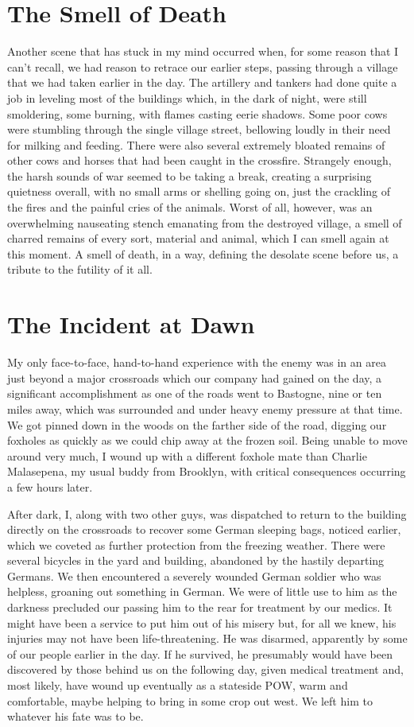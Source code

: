 \documentclass[../m3y]{subfiles}
\begin{document}
\section{The Smell of Death}
Another scene that has stuck in my mind occurred when, for some reason that I can't recall, we had reason to retrace our earlier steps, passing through a village that we had taken earlier in the day. The artillery and tankers had done quite a job in leveling most of the buildings which, in the dark of night, were still smoldering, some burning, with flames casting eerie shadows. Some poor cows were stumbling through the single village street, bellowing loudly in their need for milking and feeding. There were also several extremely bloated remains of other cows and horses that had been caught in the crossfire. Strangely enough, the harsh sounds of war seemed to be taking a break, creating a surprising quietness overall, with no small arms or shelling going on, just the crackling of the fires and the painful cries of the animals. Worst of all, however, was an overwhelming nauseating stench emanating from the destroyed village, a smell of charred remains of every sort, material and animal, which I can smell again at this moment. A smell of death, in a way, defining the desolate scene before us, a tribute to the futility of it all.

\section{The Incident at Dawn}
My only face-to-face, hand-to-hand experience with the enemy was in an area just beyond a major crossroads which our company had gained on the day, a significant accomplishment as one of the roads went to Bastogne, nine or ten miles away, which was surrounded and under heavy enemy pressure at that time. We got pinned down in the woods on the farther side of the road, digging our foxholes as quickly as we could chip away at the frozen soil. Being unable to move around very much, I wound up with a different foxhole mate than Charlie Malasepena, my usual buddy from Brooklyn, with critical consequences occurring a few hours later.

After dark, I, along with two other guys, was dispatched to return to the building directly on the crossroads to recover some German sleeping bags, noticed earlier, which we coveted as further protection from the freezing weather. There were several bicycles in the yard and building, abandoned by the hastily departing Germans. We then encountered a severely wounded German soldier who was helpless, groaning out something in German. We were of little use to him as the darkness precluded our passing him to the rear for treatment by our medics. It might have been a service to put him out of his misery but, for all we knew, his injuries may not have been life-threatening. He was disarmed, apparently by some of our people earlier in the day. If he survived, he presumably would have been discovered by those behind us on the following day, given medical treatment and, most likely, have wound up eventually as a stateside POW, warm and comfortable, maybe helping to bring in some crop out west. We left him to whatever his fate was to be.
\end{document}
